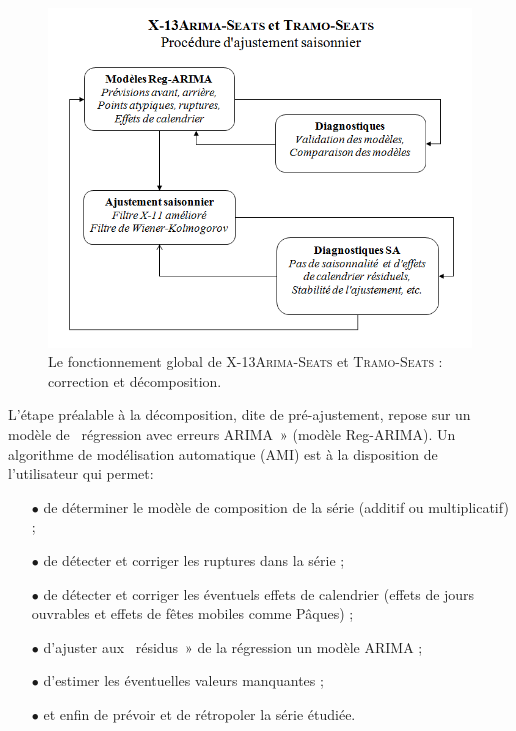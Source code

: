 \documentclass[12pt, a4paper, french]{article}
\begin{document}
\begin{figure}[!ht]
\begin{center}
 \includegraphics[scale=0.8]{img/MethodesX13-TS.png}
 \caption{Le fonctionnement global de \textsc{X-13Arima-Seats} et \textsc{Tramo-Seats} : correction et décomposition.}
 \label{fig:X13TS}
\end{center}
\end{figure}

L'étape préalable à la décomposition, dite de pré-ajustement, repose sur un modèle de \og~régression avec erreurs ARIMA~» (modèle Reg-ARIMA). Un algorithme de modélisation automatique (AMI) est à la disposition de l'utilisateur qui permet:
\begin{itemize}
  \item[$\bullet$] de déterminer le modèle de composition de la série (additif ou multiplicatif) ;
	\item[$\bullet$] de détecter et corriger les ruptures dans la série ; 
	\item[$\bullet$] de détecter et corriger les éventuels effets de calendrier (effets de jours ouvrables et effets de fêtes mobiles comme Pâques) ;
	\item[$\bullet$] d'ajuster aux \og~résidus~» de la régression un modèle ARIMA ;
	\item[$\bullet$] d'estimer les éventuelles valeurs manquantes ;
	\item[$\bullet$] et enfin de prévoir et de rétropoler la série étudiée.
\end{itemize}
\end{document}
